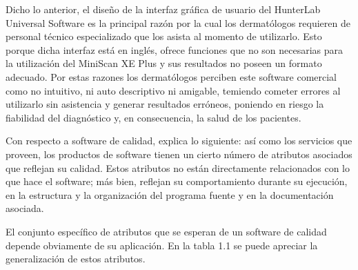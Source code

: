 	Dicho lo anterior, el dise\~{n}o de la interfaz gr\'{a}fica de usuario del HunterLab Universal Software es la principal raz\'{o}n por la cual los dermat\'{o}logos requieren de personal t\'{e}cnico especializado que los asista al momento de utilizarlo. Esto porque dicha interfaz est\'{a} en ingl\'{e}s, ofrece funciones que no son necesarias para la utilizaci\'{o}n del MiniScan XE Plus y sus resultados no poseen un formato adecuado. Por estas razones los dermat\'{o}logos perciben este software comercial como no intuitivo, ni auto descriptivo ni amigable, temiendo cometer errores al utilizarlo sin asistencia y generar resultados err\'{o}neos, poniendo en riesgo la fiabilidad del diagn\'{o}stico y, en consecuencia, la salud de los pacientes.

	Con respecto a software de calidad, \cite{Sommerville} explica lo siguiente: as\'{i} como los servicios que proveen, los productos de software tienen un cierto n\'{u}mero de atributos asociados que reflejan su calidad. Estos atributos no est\'{a}n directamente relacionados con lo que hace el software; m\'{a}s bien, reflejan su comportamiento durante su ejecuci\'{o}n, en la estructura y la organizaci\'{o}n del programa fuente y en la documentaci\'{o}n asociada.

El conjunto espec\'{i}fico de atributos que se esperan de un software de calidad depende obviamente de su aplicaci\'{o}n. En la tabla 1.1 se puede apreciar la generalizaci\'{o}n de estos atributos.

